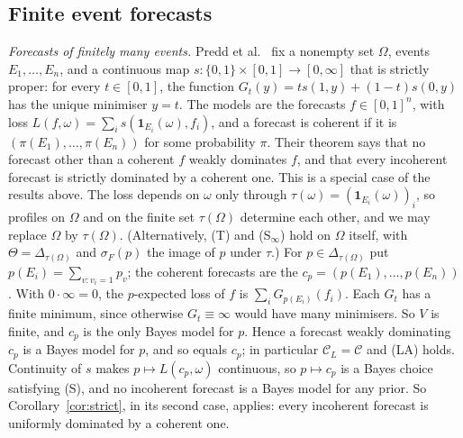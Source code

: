 \documentclass[11pt]{article}
\theoremstyle{definition}
\theoremstyle{remark}
\newcommand{\C}{\mathcal C}
\newcommand{\one}{\mathbf 1}
\begin{document}
\subsection{Finite event forecasts}\label{sec:forecasts}
\emph{Forecasts of finitely many events.} Predd et al.~\cite[Theorem~1]{Predd} fix a nonempty set $\Omega$, events $E_1,\dots,E_n$, and a continuous map $s:\{0,1\}\times[0,1]\to[0,\infty]$ that is strictly proper: for every $t\in[0,1]$, the function $G_t(y)=ts(1,y)+(1-t)s(0,y)$ has the unique minimiser $y=t$. The models are the forecasts $f\in[0,1]^n$, with loss $L(f,\omega)=\sum_is(\one_{E_i}(\omega),f_i)$, and a forecast is coherent if it is $(\pi(E_1),\dots,\pi(E_n))$ for some probability $\pi$. Their theorem says that no forecast other than a coherent $f$ weakly dominates $f$, and that every incoherent forecast is strictly dominated by a coherent one. This is a special case of the results above. The loss depends on $\omega$ only through $\tau(\omega)=(\one_{E_i}(\omega))_i$, so profiles on $\Omega$ and on the finite set $\tau(\Omega)$ determine each other, and we may replace $\Omega$ by $\tau(\Omega)$. (Alternatively, (T) and (S$_\infty$) hold on $\Omega$ itself, with $\Theta=\Delta_{\tau(\Omega)}$ and $\sigma_F(p)$ the image of $p$ under $\tau$.) For $p\in\Delta_{\tau(\Omega)}$ put $p(E_i)=\sum_{v:v_i=1}p_v$; the coherent forecasts are the $c_p=(p(E_1),\dots,p(E_n))$. With $0\cdot\infty=0$, the $p$-expected loss of $f$ is $\sum_iG_{p(E_i)}(f_i)$. Each $G_t$ has a finite minimum, since otherwise $G_t\equiv\infty$ would have many minimisers. So $V$ is finite, and $c_p$ is the only Bayes model for $p$. Hence a forecast weakly dominating $c_p$ is a Bayes model for $p$, and so equals $c_p$; in particular $\C_L=\C$ and (LA) holds. Continuity of $s$ makes $p\mapsto L(c_p,\omega)$ continuous, so $p\mapsto c_p$ is a Bayes choice satisfying (S), and no incoherent forecast is a Bayes model for any prior. So Corollary~\ref{cor:strict}, in its second case, applies: every incoherent forecast is uniformly dominated by a coherent one.
\end{document}
